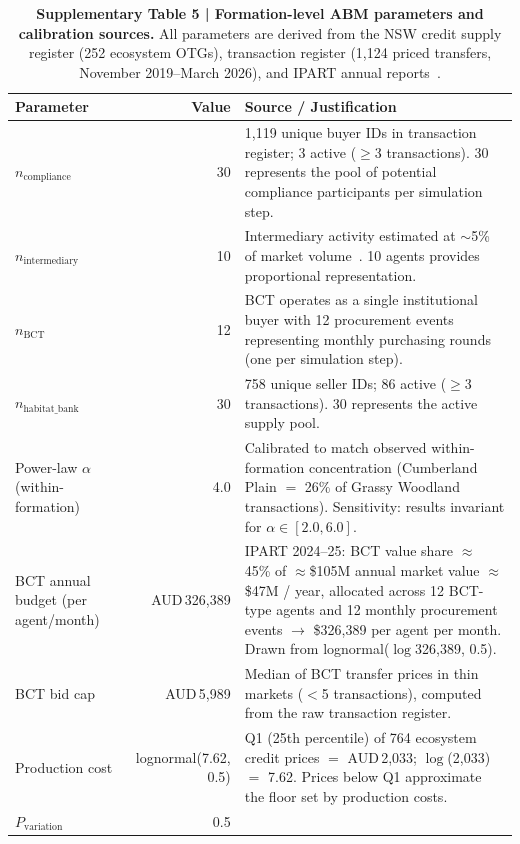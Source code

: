 \documentclass[pdflatex,sn-nature,oneside]{sn-jnl}
\begin{document}
\begin{table}[h]
\caption{%
  \textbf{Supplementary Table 5 | Formation-level ABM parameters and calibration sources.}
  All parameters are derived from the NSW credit supply register (252 ecosystem OTGs),
  transaction register (1,124 priced transfers, November 2019--March 2026), and
  IPART annual reports~\cite{IPART2024,IPART2025}.
}\label{tab:supp_parameters}
\begin{tabular}{@{}p{4.8cm}rp{7.0cm}@{}}
\toprule
Parameter & Value & Source / Justification \\
\midrule
$n_{\text{compliance}}$ & 30
  & 1,119 unique buyer IDs in transaction register; 3 active ($\geq$3 transactions).
    30 represents the pool of potential compliance participants per simulation step. \\[4pt]
$n_{\text{intermediary}}$ & 10
  & Intermediary activity estimated at ${\sim}$5\% of market volume~\cite{IPART2025}.
    10 agents provides proportional representation. \\[4pt]
$n_{\text{BCT}}$ & 12
  & BCT operates as a single institutional buyer with 12 procurement events representing
    monthly purchasing rounds (one per simulation step). \\[4pt]
$n_{\text{habitat\_bank}}$ & 30
  & 758 unique seller IDs; 86 active ($\geq$3 transactions).
    30 represents the active supply pool. \\[4pt]
Power-law $\alpha$ (within-formation) & 4.0
  & Calibrated to match observed within-formation concentration
    (Cumberland Plain $=$ 26\% of Grassy Woodland transactions).
    Sensitivity: results invariant for $\alpha \in [2.0, 6.0]$. \\[4pt]
BCT annual budget (per agent/month) & AUD\,326{,}389
  & IPART 2024--25: BCT value share $\approx$ 45\% of $\approx$\$105M
    annual market value $\approx$ \$47M / year, allocated across 12
    BCT-type agents and 12 monthly procurement events $\to$ \$326{,}389
    per agent per month. Drawn from lognormal($\log$326{,}389, 0.5). \\[4pt]
BCT bid cap & AUD\,5{,}989
  & Median of BCT transfer prices in thin markets ($<$5
    transactions), computed from the raw transaction register. \\[4pt]
Production cost & lognormal(7.62, 0.5)
  & Q1 (25th percentile) of 764 ecosystem credit prices $=$ AUD\,2{,}033;
    $\log$(2{,}033) $=$ 7.62. Prices below Q1 approximate the floor set
    by production costs. \\[4pt]
$P_{\text{variation}}$ & 0.5

\end{tabular}
\end{table}
\end{document}
